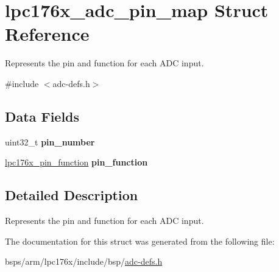 \hypertarget{structlpc176x__adc__pin__map}{}\section{lpc176x\+\_\+adc\+\_\+pin\+\_\+map Struct Reference}
\label{structlpc176x__adc__pin__map}


Represents the pin and function for each A\+DC input.  




{\ttfamily \#include $<$adc-\/defs.\+h$>$}

\subsection*{Data Fields}
\begin{DoxyCompactItemize}
\item 
\mbox{\label{structlpc176x__adc__pin__map_a467cee7c0e24b9d1c2303ac89eefc154}} 
uint32\+\_\+t {\bfseries pin\+\_\+number}
\item 
\mbox{\label{structlpc176x__adc__pin__map_a9127fe85980205b0573598b68799dfbd}} 
\mbox{\hyperlink{io-defs_8h_a93321e597449441e81f45118a89a304e}{lpc176x\+\_\+pin\+\_\+function}} {\bfseries pin\+\_\+function}
\end{DoxyCompactItemize}


\subsection{Detailed Description}
Represents the pin and function for each A\+DC input. 

The documentation for this struct was generated from the following file\+:\begin{DoxyCompactItemize}
\item 
bsps/arm/lpc176x/include/bsp/\mbox{\hyperlink{adc-defs_8h}{adc-\/defs.\+h}}\end{DoxyCompactItemize}
